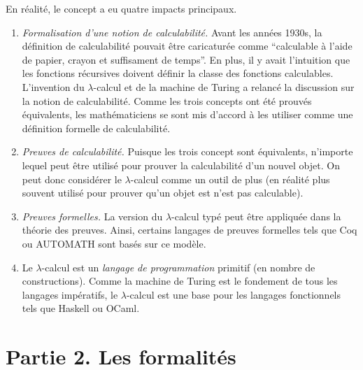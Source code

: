 \documentclass[12pt, a4paper]{article}
\begin{document}
En réalité, le concept a eu quatre impacts principaux.
\begin{enumerate}
	\item \emph{Formalisation d'une notion de calculabilité.} Avant les années 1930s, la définition de calculabilité pouvait être caricaturée comme ``calculable à l'aide de papier, crayon et suffisament de temps''. En plus, il y avait l'intuition que les fonctions récursives doivent définir la classe des fonctions calculables.
	L'invention du $\lambda$-calcul et de la machine de Turing a relancé la discussion sur la notion de calculabilité. Comme les trois concepts ont été prouvés équivalents, les mathématiciens se sont mis d'accord à les utiliser comme une définition formelle de calculabilité.
	\item \emph{Preuves de calculabilité.} Puisque les trois concept sont équivalents, n'importe lequel peut être utilisé pour prouver la calculabilité d'un nouvel objet. On peut donc considérer le $\lambda$-calcul comme un outil de plus (en réalité plus souvent utilisé pour prouver qu'un objet est n'est pas calculable).
	\item \emph{Preuves formelles.}
	La version du $\lambda$-calcul typé peut être appliquée dans la théorie des preuves. Ainsi, certains langages de preuves formelles tels que Coq ou AUTOMATH sont basés sur ce modèle.
	
	\item Le $\lambda$-calcul est un \emph{langage de programmation} primitif (en nombre de constructions). Comme la machine de Turing est le fondement de tous les langages impératifs, le $\lambda$-calcul est une base pour les langages fonctionnels tels que Haskell ou OCaml.
\end{enumerate}

\newpage
\section*{Partie 2. Les formalités}
\end{document}
